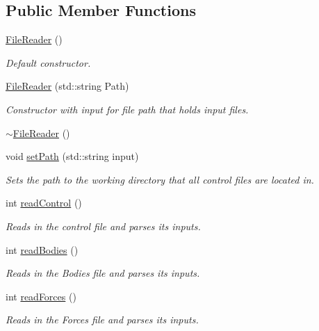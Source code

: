 \subsection*{Public Member Functions}
\begin{DoxyCompactItemize}
\item 
\hyperlink{classosea_1_1_file_reader_a615dcb2443cad1f2ca123c7c0c334480}{File\-Reader} ()
\begin{DoxyCompactList}\small\item\em Default constructor. \end{DoxyCompactList}\item 
\hyperlink{classosea_1_1_file_reader_a518fc07a4da5ff10374302fd253d3f45}{File\-Reader} (std\-::string Path)
\begin{DoxyCompactList}\small\item\em Constructor with input for file path that holds input files. \end{DoxyCompactList}\item 
\hyperlink{classosea_1_1_file_reader_a1382969e8f1468f3b04ad4b44ab39dee}{$\sim$\-File\-Reader} ()
\item 
void \hyperlink{classosea_1_1_file_reader_a0b12de2af52dc0cdfae5ab337bf494dc}{set\-Path} (std\-::string input)
\begin{DoxyCompactList}\small\item\em Sets the path to the working directory that all control files are located in. \end{DoxyCompactList}\item 
int \hyperlink{classosea_1_1_file_reader_a967cab6ec0822fd8bcf392873a8a82b1}{read\-Control} ()
\begin{DoxyCompactList}\small\item\em Reads in the control file and parses its inputs. \end{DoxyCompactList}\item 
int \hyperlink{classosea_1_1_file_reader_a44770836db4ab430139118727ace6547}{read\-Bodies} ()
\begin{DoxyCompactList}\small\item\em Reads in the Bodies file and parses its inputs. \end{DoxyCompactList}\item 
int \hyperlink{classosea_1_1_file_reader_ab78d2f631eb8e64b0a68d25eeca80be5}{read\-Forces} ()
\begin{DoxyCompactList}\small\item\em Reads in the Forces file and parses its inputs. \end{DoxyCompactList}\item 

\end{DoxyCompactItemize}
